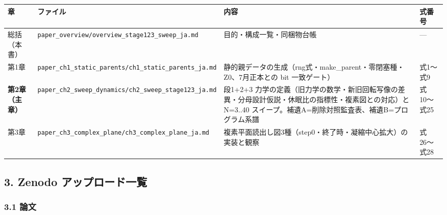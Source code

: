 \documentclass[
  a4paper,
]{ltjsarticle}
\newcounter{none} %
\begin{document}
{\def\LTcaptype{none} %
\begin{longtable}[]{@{}
  >{\raggedright\arraybackslash}p{}
  >{\raggedright\arraybackslash}p{}
  >{\raggedright\arraybackslash}p{}
  >{\raggedright\arraybackslash}p{}@{}}
\toprule\noalign{}
\begin{minipage}[b]{\linewidth}\raggedright
章
\end{minipage} & \begin{minipage}[b]{\linewidth}\raggedright
ファイル
\end{minipage} & \begin{minipage}[b]{\linewidth}\raggedright
内容
\end{minipage} & \begin{minipage}[b]{\linewidth}\raggedright
式番号
\end{minipage} \\
\midrule\noalign{}
\endhead
\bottomrule\noalign{}
\endlastfoot
総括（本書） & \texttt{paper\_overview/overview\_stage123\_sweep\_ja.md}
& 目的・構成一覧・同梱物台帳 & --- \\
第1章 & \texttt{paper\_ch1\_static\_parents/ch1\_static\_parents\_ja.md}
& 静的親データの生成（rng式・make\_parent・零閉塞種・Z0、7月正本との bit
一致ゲート） & 式1〜式9 \\
\textbf{第2章（主章）} &
\texttt{paper\_ch2\_sweep\_dynamics/ch2\_sweep\_stage123\_ja.md} &
段1+2+3
力学の定義（旧力学の数学・新旧回転写像の差異・分母設計仮説・休眠比の指標性・複素図との対応）と
N=3..40 スイープ。補遺A=削除対照監査表、補遺B=プログラム系譜 &
式10〜式25 \\
第3章 & \texttt{paper\_ch3\_complex\_plane/ch3\_complex\_plane\_ja.md} &
複素平面読出し図3種（step0・終了時・凝縮中心拡大）の実装と観察 &
式26〜式28 \\
\end{longtable}
}

\subsection{3. Zenodo
アップロード一覧}\label{zenodo-ux30a2ux30c3ux30d7ux30edux30fcux30c9ux4e00ux89a7}

\subsubsection{3.1 論文}\label{ux8ad6ux6587}
\end{document}
